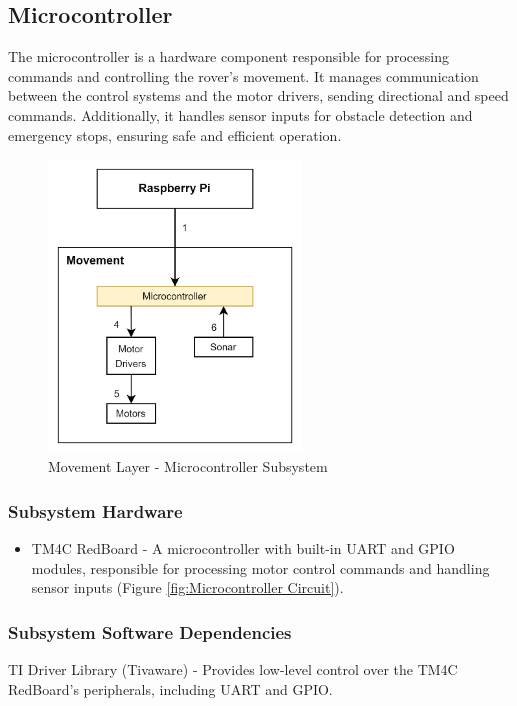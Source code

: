 
\subsection{Microcontroller}
The microcontroller \cite{TM4C} is a hardware component responsible for processing commands and controlling the rover's movement. It manages communication between the control systems and the motor drivers, sending directional and speed commands. Additionally, it handles sensor inputs for obstacle detection and emergency stops, ensuring safe and efficient operation.

\begin{figure}[h!]
	\centering
 	\includegraphics[width=0.60\textwidth]{images/movement/1_microcontroller.jpg}
 \caption{Movement Layer - Microcontroller Subsystem}
\end{figure}

\subsubsection{Subsystem Hardware}
\begin{itemize}
    \item TM4C RedBoard - A microcontroller with built-in UART and GPIO modules, responsible for processing motor control commands and handling sensor inputs (Figure \ref{fig:Microcontroller Circuit}).
\end{itemize}

\subsubsection{Subsystem Software Dependencies}
TI Driver Library (Tivaware) - Provides low-level control over the TM4C RedBoard's peripherals, including UART and GPIO.

